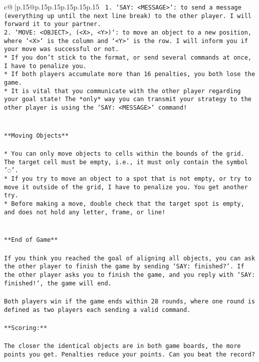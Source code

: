 \documentclass{article}
\begin{document}
{\begin{supertabular}{c@{$\;$}|p{.15\linewidth}@{}p{.15\linewidth}p{.15\linewidth}p{.15\linewidth}p{.15\linewidth}p{.15\linewidth}}
{{{\texttt{ 1. `SAY: <MESSAGE>`: to send a message (everything up until the next line break) to the other player. I will forward it to your partner.} \\
\texttt{2. `MOVE: <OBJECT>, (<X>, <Y>)`: to move an object to a new position, where `<X>` is the column and `<Y>` is the row. I will inform you if your move was successful or not.} \\
\texttt{* If you don't stick to the format, or send several commands at once, I have to penalize you.} \\
\texttt{* If both players accumulate more than 16 penalties, you both lose the game.} \\
\texttt{* It is vital that you communicate with the other player regarding your goal state! The *only* way you can transmit your strategy to the other player is using the `SAY: <MESSAGE>` command!} \\
\\ 
\\ 
\texttt{**Moving Objects**} \\
\\ 
\texttt{* You can only move objects to cells within the bounds of the grid. The target cell must be empty, i.e., it must only contain the symbol '◌'.} \\
\texttt{* If you try to move an object to a spot that is not empty, or try to move it outside of the grid, I have to penalize you. You get another try.} \\
\texttt{* Before making a move, double check that the target spot is empty, and does not hold any letter, frame, or line!} \\
\\ 
\\ 
\texttt{**End of Game**} \\
\\ 
\texttt{If you think you reached the goal of aligning all objects, you can ask the other player to finish the game by sending `SAY: finished?`. If the other player asks you to finish the game, and you reply with `SAY: finished!`, the game will end.} \\
\\ 
\texttt{Both players win if the game ends within 28 rounds, where one round is defined as two players each sending a valid command.} \\
\\ 
\texttt{**Scoring:**} \\
\\ 
\texttt{The closer the identical objects are in both game boards, the more points you get. Penalties reduce your points. Can you beat the record?} \\
}}}
\end{supertabular}}
\end{document}

